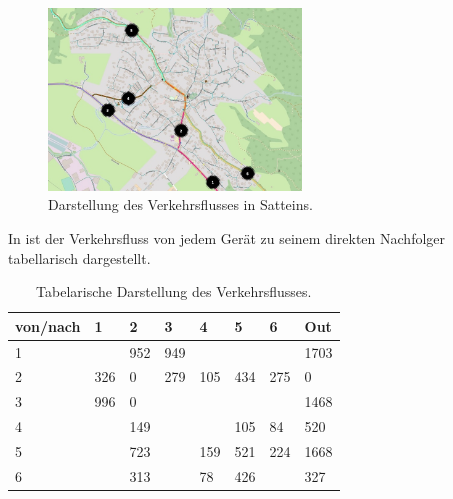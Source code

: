 \begin{figure}[H]
  \centering
  \includegraphics[width=0.6\textwidth]{Resultate/Auswertung.jpg} 
  \caption{Darstellung des Verkehrsflusses in Satteins.}
  \label{bAuswertung}
\end{figure}
In  ist der Verkehrsfluss von jedem Gerät zu seinem direkten Nachfolger tabellarisch dargestellt. 

\setlength\tabcolsep{5pt}

\begin{table}[H]
\centering
\begin{tabular}{|p{1.5cm}|p{1.5cm}|p{1.5cm}|p{1.5cm}|p{1.5cm}|p{1.5cm}|p{1.5cm}|p{1.5cm}|}
\hline
	von/nach & 1 & 2 & 3 & 4 & 5 & 6 & Out \\ \hline
	1 &  & 952 & 949 &  &  &  & 1703 \\ \hline
	2 & 326 & 0 & 279 & 105 & 434 & 275 & 0 \\ \hline
	3 & 996 & 0 &  &  &  &  & 1468 \\ \hline
	4 &  & 149 &  &  & 105 & 84 & 520 \\ \hline
	5 &  & 723 &  & 159 & 521 & 224 & 1668 \\ \hline
	6 &  & 313 &  & 78 & 426 &  & 327 \\ \hline
\end{tabular}
\caption{Tabelarische Darstellung des Verkehrsflusses.}
\label{tVerkehrsfluss}
\end{table}

\setlength\tabcolsep{0pt}